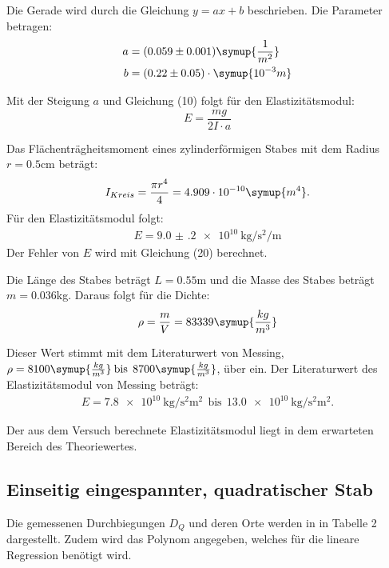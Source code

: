 Die Gerade wird durch die Gleichung $y = ax + b$ beschrieben. Die Parameter betragen:
\begin{align*}
  a &= (0.059 \pm 0.001) \symup{\frac{1}{m^2}}\\
  b &= (0.22  \pm 0.05) \cdot \symup{10^{-3}m}
\end{align*}

Mit der Steigung $a$ und Gleichung (10) folgt für den Elastizitätsmodul:
\begin{equation}
  E = \frac{mg}{2I \cdot a}
\end{equation}

Das Flächenträgheitsmoment eines zylinderförmigen Stabes mit dem Radius
$r = 0.5$cm beträgt:
\begin{equation}
  I_{Kreis} = \frac{\pi r^4}{4} = 4.909 \cdot 10^{-10} \symup{m^4} .
\end{equation}
Für den Elastizitätsmodul folgt:
\begin{align*}
  E = \SI{9.0(2)e10}{\kilo\gram\per\second\squared\per\meter}
\end{align*}
Der Fehler von $E$ wird mit Gleichung (20) berechnet.

Die Länge des Stabes beträgt $L = 0.55$m und die Masse des Stabes beträgt $m = 0.036$kg.
Daraus folgt für die Dichte:
\begin{equation}
  \rho = \frac{m}{V} = 83339 \symup{\frac{kg}{m^3}}
\end{equation}

Dieser Wert stimmt mit dem Literaturwert von Messing, $\rho =8100\symup{\frac{kg}{m^3}}\: \text{bis}\:\: 8700\symup{\frac{kg}{m^3}}$,
über ein.
Der Literaturwert des Elastizitätsmodul von Messing beträgt:
\begin{align*}
  E = \SI{7.8e10}{\kilo\gram\per\second\squared\square\meter} \:\: \text{bis} \:\:
  \SI{13.0e10}{\kilo\gram\per\second\squared\square\meter} .
\end{align*}

Der aus dem Versuch berechnete Elastizitätsmodul liegt in dem erwarteten Bereich des Theoriewertes.

\subsection{Einseitig eingespannter, quadratischer Stab}
Die gemessenen Durchbiegungen $D_Q$ und deren Orte werden in in Tabelle 2 dargestellt. Zudem wird
das Polynom angegeben, welches für die lineare Regression benötigt wird.

